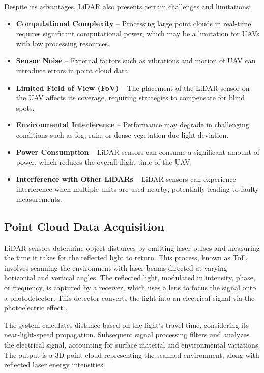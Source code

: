             Despite its advantages, \ac{LiDAR} also presents certain challenges and limitations:  
            \begin{itemize}  
                \item \textbf{Computational Complexity} -- Processing large point clouds in real-time requires significant computational power, which may be a limitation for \ac{UAV}s with low processing resources.
                \item \textbf{Sensor Noise} -- External factors such as vibrations and motion of \ac{UAV} can introduce errors in point cloud data.  
                \item \textbf{Limited Field of View (FoV)} -- The placement of the \ac{LiDAR} sensor on the \ac{UAV} affects its coverage, requiring strategies to compensate for blind spots.  
                \item \textbf{Environmental Interference} -- Performance may degrade in challenging conditions such as fog, rain, or dense vegetation due light deviation.  
                \item \textbf{Power Consumption} -- \ac{LiDAR} sensors can consume a significant amount of power, which reduces the overall flight time of the \ac{UAV}.
                \item \textbf{Interference with Other LiDARs} -- \ac{LiDAR} sensors can experience interference when multiple units are used nearby, potentially leading to faulty measurements.
            \end{itemize}

        \subsection{Point Cloud Data Acquisition}
            \ac{LiDAR} sensors determine object distances by emitting laser pulses and measuring the time it takes for the reflected light to return. 
            This process, known as \ac{ToF}, involves scanning the environment with laser beams directed at varying horizontal and vertical angles. 
            The reflected light, modulated in intensity, phase, or frequency, is captured by a receiver, which uses a lens to focus the signal onto a photodetector. 
            This detector converts the light into an electrical signal via the photoelectric effect \cite{lidar_how_works}.

            The system calculates distance based on the light's travel time, considering its near-light-speed propagation. 
            Subsequent signal processing filters and analyzes the electrical signal, accounting for surface material and environmental variations. 
            The output is a 3D point cloud representing the scanned environment, along with reflected laser energy intensities. 


